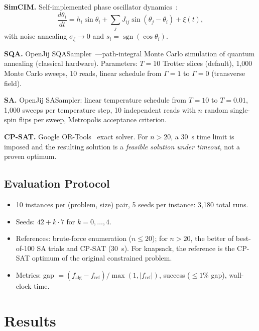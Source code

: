 \documentclass[10pt,twocolumn]{article}
\begin{document}
\textbf{SimCIM.} Self-implemented phase oscillator dynamics~\cite{leleu2021}:
\begin{equation}\label{eq:simcim}
\frac{d\theta_i}{dt}=h_i\sin\theta_i+\sum_jJ_{ij}\sin(\theta_j-\theta_i)+\xi(t),
\end{equation}
with noise annealing $\sigma_\xi\to0$ and $s_i=\operatorname{sgn}(\cos\theta_i)$.

\textbf{SQA.} OpenJij SQASampler~\cite{openjij}---path-integral Monte Carlo simulation of quantum annealing (classical hardware). Parameters: $T=10$ Trotter slices (default), 1,000 Monte Carlo sweeps, 10 reads, linear schedule from $\Gamma=1$ to $\Gamma=0$ (transverse field).

\textbf{SA.} OpenJij SASampler: linear temperature schedule from $T=10$ to $T=0.01$, 1,000 sweeps per temperature step, 10 independent reads with $n$ random single-spin flips per sweep, Metropolis acceptance criterion.

\textbf{CP-SAT.} Google OR-Tools~\cite{ortools} exact solver. For $n>20$, a 30~s time limit is imposed and the resulting solution is a \emph{feasible solution under timeout}, not a proven optimum.

\subsection{Evaluation Protocol}
\label{sec:protocol}
\begin{itemize}
  \item 10 instances per (problem, size) pair, 5 seeds per instance: 3,180 total runs.
  \item Seeds: $42+k\cdot7$ for $k=0,\dots,4$.
  \item References: brute-force enumeration ($n\leq20$); for $n>20$, the better of best-of-100 SA trials and CP-SAT (30~s). For knapsack, the reference is the CP-SAT optimum of the original constrained problem.
  \item Metrics: gap $=(f_{\text{alg}}-f_{\text{ref}})/\max(1,|f_{\text{ref}}|)$, success ($\leq1\%$ gap), wall-clock time.
\end{itemize}

\section{Results}
\label{sec:results}
\end{document}
